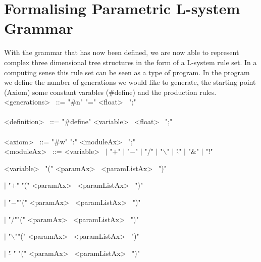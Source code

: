 \section{Formalising Parametric L-system Grammar}

With the grammar that has now been defined, we are now able to represent complex three dimensional tree structures in the form of a L-system rule set. In a computing sense this rule set can be seen as a type of program. In the program we define the number of generations we would like to generate, the starting point (Axiom) some constant varables (\#define) and the production rules. \\

\textless generations\textgreater~ ::= "\#n" "=" \textless float\textgreater~ ";" \\
\\
\textless definition\textgreater~ ::=  "\#define" \textless variable\textgreater~ \textless float\textgreater~ ";" \\
\\
\textless axiom\textgreater~ ::=  "\#w" ":" \textless moduleAx\textgreater~ ";" \\
\textless moduleAx\textgreater~  ::= \textless variable\textgreater~ $|$ "$+$" $|$ "$-$" $|$ "/" $|$ "$\backslash$" $|$ "$\hat{}$" $|$ "$\&$" $|$ "!" 

\hspace{1cm} \textless variable\textgreater~ "("  \textless paramAx\textgreater~ \textless paramListAx\textgreater~ ")"

\hspace{1cm} $|$ "$+$" "("  \textless paramAx\textgreater~ \textless paramListAx\textgreater~ ")" 

\hspace{1cm} $|$ "$-$""("  \textless paramAx\textgreater~ \textless paramListAx\textgreater~ ")" 

\hspace{1cm} $|$ "/""("  \textless paramAx\textgreater~ \textless paramListAx\textgreater~ ")" 

\hspace{1cm} $|$ "$\backslash$""("  \textless paramAx\textgreater~ \textless paramListAx\textgreater~ ")" 

\hspace{1cm} $|$ "$\hat{}$ " "("  \textless paramAx\textgreater~ \textless paramListAx\textgreater~ ")" 

